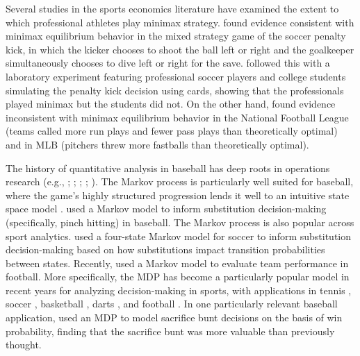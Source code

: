 \documentclass[opre,dblanonrev]{informs4}
\begin{document}
    Several studies in the sports economics literature have examined the extent to which professional athletes play minimax strategy. \citet{palacios-huerta_professionals_2003} found evidence consistent with minimax equilibrium behavior in the mixed strategy game of the soccer penalty kick, in which the kicker chooses to shoot the ball left or right and the goalkeeper simultaneously chooses to dive left or right for the save. \citet{palacios-huerta_experientia_2008} followed this with a laboratory experiment featuring professional soccer players and college students simulating the penalty kick decision using cards, showing that the professionals played minimax but the students did not. On the other hand, \citet{kovash_professionals_2009} found evidence inconsistent with minimax equilibrium behavior in the National Football League (teams called more run plays and fewer pass plays than theoretically optimal) and in MLB (pitchers threw more fastballs than theoretically optimal).

    The history of quantitative analysis in baseball has deep roots in operations research (e.g., \citealp{lindsey_investigation_1963}; \citealp{freeze_analysis_1974}; \citealp{pankin_evaluating_1978}; \citealp{russell_devising_1994}; \citealp{bukiet_markov_1997}). The Markov process is particularly well suited for baseball, where the game's highly structured progression lends it well to an intuitive state space model \citep{sokol_intuitive_2004}. \citet{hirotsu_markov_2003} used a Markov model to inform substitution decision-making (specifically, pinch hitting) in baseball. The Markov process is also popular across sport analytics. \citet{hirotsu_using_2002} used a four-state Markov model for soccer to inform substitution decision-making based on how substitutions impact transition probabilities between states. Recently, \citet{chan_points_2021} used a Markov model to evaluate team performance in football. More specifically, the MDP has become a particularly popular model in recent years for analyzing decision-making in sports, with applications in tennis \citep{nadimpalli_when_2013}, soccer \citep{jarvandi_modeling_2013}, basketball \citep{sandholtz_markov_2020}, darts \citep{baird_optimising_2020}, and football \citep{biro_reinforcement_2022}. In one particularly relevant baseball application, \citet{hirotsu_using_2019} used an MDP to model sacrifice bunt decisions on the basis of win probability, finding that the sacrifice bunt was more valuable than previously thought.
\end{document}
